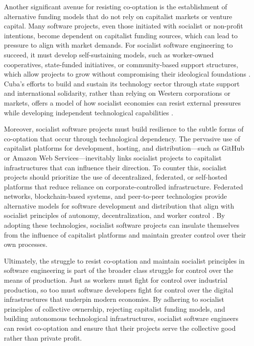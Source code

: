 \begin{refsection}
Another significant avenue for resisting co-optation is the establishment of alternative funding models that do not rely on capitalist markets or venture capital. Many software projects, even those initiated with socialist or non-profit intentions, become dependent on capitalist funding sources, which can lead to pressure to align with market demands. For socialist software engineering to succeed, it must develop self-sustaining models, such as worker-owned cooperatives, state-funded initiatives, or community-based support structures, which allow projects to grow without compromising their ideological foundations \cite[pp.~245-248]{mueller2010}. Cuba’s efforts to build and sustain its technology sector through state support and international solidarity, rather than relying on Western corporations or markets, offers a model of how socialist economies can resist external pressures while developing independent technological capabilities \cite[pp.~80-83]{ernesto1968}.

Moreover, socialist software projects must build resilience to the subtle forms of co-optation that occur through technological dependency. The pervasive use of capitalist platforms for development, hosting, and distribution—such as GitHub or Amazon Web Services—inevitably links socialist projects to capitalist infrastructures that can influence their direction. To counter this, socialist projects should prioritize the use of decentralized, federated, or self-hosted platforms that reduce reliance on corporate-controlled infrastructure. Federated networks, blockchain-based systems, and peer-to-peer technologies provide alternative models for software development and distribution that align with socialist principles of autonomy, decentralization, and worker control \cite[pp.~29-32]{moglen2003}. By adopting these technologies, socialist software projects can insulate themselves from the influence of capitalist platforms and maintain greater control over their own processes.

Ultimately, the struggle to resist co-optation and maintain socialist principles in software engineering is part of the broader class struggle for control over the means of production. Just as workers must fight for control over industrial production, so too must software developers fight for control over the digital infrastructures that underpin modern economies. By adhering to socialist principles of collective ownership, rejecting capitalist funding models, and building autonomous technological infrastructures, socialist software engineers can resist co-optation and ensure that their projects serve the collective good rather than private profit.


\end{refsection}
